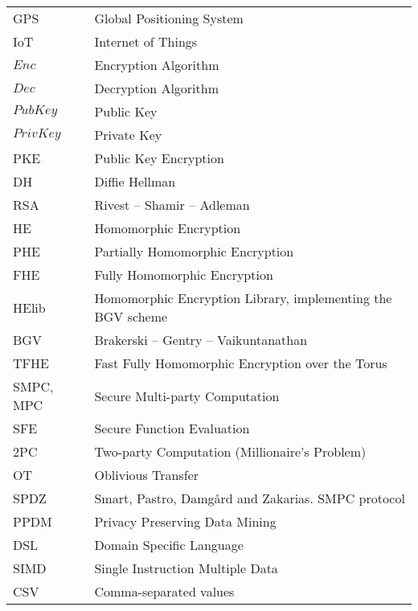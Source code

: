 \abbreviations
\begin{center}
	\renewcommand{\arraystretch}{1.5}
	\begin{longtable}{ l @{\qquad} l }
	\toprule
	GPS 			& Global Positioning System \\
	IoT				& Internet of Things \\
  $Enc$     & Encryption Algorithm \\
  $Dec$     & Decryption Algorithm \\
  $PubKey$  & Public Key \\
  $PrivKey$ & Private Key \\
  PKE       & Public Key Encryption \\
  DH        & Diffie Hellman \\
  RSA       & Rivest -- Shamir -- Adleman \\
  HE        & Homomorphic Encryption \\
  PHE       & Partially Homomorphic Encryption \\
  FHE       & Fully Homomorphic Encryption \\
  HElib     & Homomorphic Encryption Library, implementing the BGV scheme \\
  BGV       & Brakerski -- Gentry -- Vaikuntanathan \\
  TFHE      & Fast Fully Homomorphic Encryption over the Torus \\
  SMPC, MPC & Secure Multi-party Computation \\
  SFE       & Secure Function Evaluation \\
  2PC       & Two-party Computation (Millionaire's Problem) \\
  OT        & Oblivious Transfer \\
  SPDZ      & Smart, Pastro, Damg{\aa}rd and Zakarias. SMPC protocol \\
  PPDM      & Privacy Preserving Data Mining \\
  DSL       & Domain Specific Language \\
  SIMD      & Single Instruction Multiple Data \\
	CSV 			& Comma-separated values\\

	\bottomrule
	\end{longtable}
\end{center}
